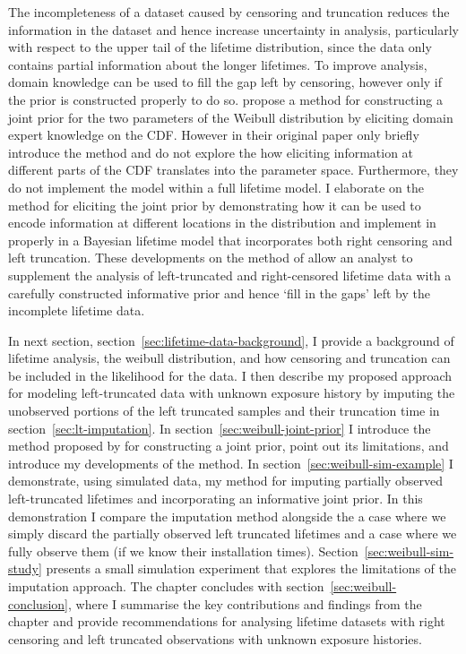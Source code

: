 The incompleteness of a dataset caused by censoring and truncation reduces the information in the dataset and hence increase uncertainty in analysis, particularly with respect to the upper tail of the lifetime distribution, since the data only contains partial information about the longer lifetimes. To improve analysis, domain knowledge can be used to fill the gap left by censoring, however only if the prior is constructed properly to do so. \citet{kaminskiy2005} propose a method for constructing a joint prior for the two parameters of the Weibull distribution by eliciting domain expert knowledge on the CDF. However in their original paper \citeauthor{kaminskiy2005} only briefly introduce the method and do not explore the how eliciting information at different parts of the CDF translates into the parameter space. Furthermore, they do not implement the model within a full lifetime model. I elaborate on the method for eliciting the joint prior by demonstrating how it can be used to encode information at different locations in the distribution and implement in properly in a Bayesian lifetime model that incorporates both right censoring and left truncation. These developments on the method of \citet{kaminskiy2005} allow an analyst to supplement the analysis of left-truncated and right-censored lifetime data with a carefully constructed informative prior and hence `fill in the gaps' left by the incomplete lifetime data.

In next section, section~\ref{sec:lifetime-data-background}, I provide a background of lifetime analysis, the weibull distribution, and how censoring and truncation can be included in the likelihood for the data. I then describe my proposed approach for modeling left-truncated data with unknown exposure history by imputing the unobserved portions of the left truncated samples and their truncation time in section~\ref{sec:lt-imputation}. In section~\ref{sec:weibull-joint-prior} I introduce the method proposed by \citet{kaminskiy2005} for constructing a joint prior, point out its limitations, and introduce my developments of the method. In section~\ref{sec:weibull-sim-example} I demonstrate, using simulated data, my method for imputing partially observed left-truncated lifetimes and incorporating an informative joint prior. In this demonstration I compare the imputation method alongside the a case where we simply discard the partially observed left truncated lifetimes and a case where we fully observe them (if we know their installation times). Section~\ref{sec:weibull-sim-study} presents a small simulation experiment that explores the limitations of the imputation approach. The chapter concludes with section~\ref{sec:weibull-conclusion}, where I summarise the key contributions and findings from the chapter and provide recommendations for analysing lifetime datasets with right censoring and left truncated observations with unknown exposure histories.

